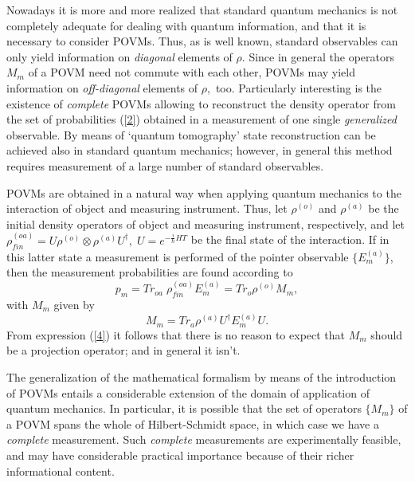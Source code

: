 \documentclass{ws-procs975x65}
\begin{document}
Nowadays it is more and more realized that standard quantum
mechanics is not completely adequate for dealing with quantum
information, and that it is necessary to consider POVMs. Thus, as
is well known, standard observables can only yield information on
\textit{diagonal} elements of $\rho.$ Since in general the
operators $M_m$ of a POVM need not commute with each other, POVMs
may yield information on \textit{off-diagonal} elements of $\rho,$
too. Particularly interesting is the existence of
\textit{complete} POVMs allowing to reconstruct the density
operator from the set of probabilities (\ref{2}) obtained in a
measurement of one single \textit{generalized} observable. By
means of `quantum tomography' state reconstruction can be achieved
also in standard quantum mechanics; however, in general this
method requires measurement of a large number of standard
observables.

POVMs are obtained in a natural way when applying quantum
mechanics to the interaction of object and measuring instrument.
Thus, let $\rho^{(o)}$ and $\rho^{(a)}$ be the initial density
operators of object and measuring instrument, respectively, and
let $\rho^{(oa)}_{fin} = U\rho^{(o)}\otimes \rho^{(a)}
U^\dagger,\;U = e^{-\frac{i}{\hbar}HT}$ be the final state of the
interaction. If in this latter state a measurement is performed of
the pointer observable $\{E^{(a)}_m\}$, then the measurement
probabilities are found according to
\begin{equation}\label{3} p_{m} = Tr_{oa}\;
\rho^{(oa)}_{fin} E^{(a)}_m= Tr_o \rho^{(o)} M_m,\end{equation}
with $M_m$ given by
\begin{equation}\label{4} M_m =Tr_{a} \rho^{(a)} U^\dagger
E^{(a)}_m U.\end{equation}
 From expression (\ref{4}) it follows that there is no reason to expect that
$M_{m}$
 should be a projection operator; and in general it isn't.

The generalization of the mathematical formalism by means of the
introduction of POVMs entails a considerable extension of the
domain of application of quantum mechanics. In particular, it is
possible that the set of operators $\{M_m\}$ of a POVM spans the
whole of Hilbert-Schmidt space, in which case we have a
\textit{complete} measurement. Such \textit{complete} measurements
are experimentally feasible\cite{dM98,dM2002,AlBaNi04}, and may
have considerable practical importance because of their richer
informational content.
\end{document}
